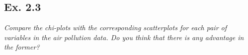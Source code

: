 \documentclass[
]{article}
\begin{document}
\hypertarget{ex.-2.3}{%
\subsection{Ex. 2.3}\label{ex.-2.3}}

\emph{Compare the chi-plots with the corresponding scatterplots for each
pair of variables in the air pollution data. Do you think that there is
any advantage in the former?}
\end{document}
